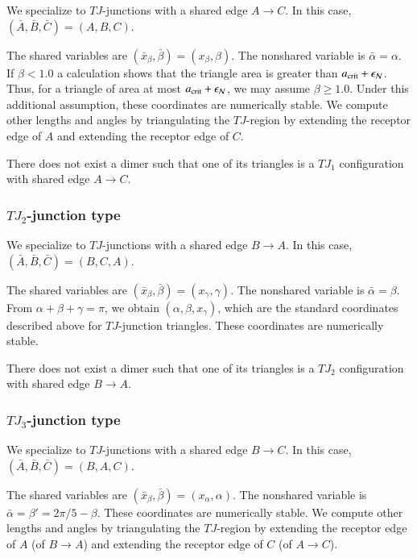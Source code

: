 We specialize to $TJ$-junctions with a shared edge $A\to C$.  In this
case, $(\bar A,\bar B,\bar C)=(A,B,C)$.

The shared variables are $(\bar x_\beta,\bar\beta)=(x_\beta,\beta)$.
The nonshared variable is $\bar\alpha=\alpha$.  If $\beta < 1.0$ a
calculation %
shows that the triangle area is greater than $a_\text{crit}+\epsilon_{\mathcal N}$.
Thus, for a triangle of area at most $a_\text{crit}+\epsilon_{\mathcal N}$, we may assume $\beta\ge1.0$.
Under this additional
assumption, these coordinates are numerically stable.
We compute other lengths and angles by triangulating the $TJ$-region
by extending the receptor edge of $A$ and extending the receptor edge
of $C$.

There does not exist a dimer such that one of its triangles
is a $TJ_1$ configuration with shared edge $A\to C$.

\subsubsection{$TJ_2$-junction type}

We specialize to $TJ$-junctions with a shared edge $B\to A$. In this
case, $(\bar A,\bar B,\bar C)=(B,C,A)$.

The shared variables are $(\bar x_\beta,\bar\beta)=(x_\gamma,\gamma)$.
The nonshared variable is $\bar\alpha =\beta$.  From
$\alpha+\beta+\gamma=\pi$, we obtain $(\alpha,\beta,x_\gamma)$, which
are the standard coordinates described above for $TJ$-junction
triangles.  These coordinates are numerically stable.

There does not exist a dimer such that one of its triangles
is a $TJ_2$ configuration with shared edge $B\to A$.

\subsubsection{$TJ_3$-junction type}

We specialize to $TJ$-junctions with a shared edge $B\to C$.
In this case, $(\bar A,\bar B,\bar C)=(B,A,C)$.

The shared variables are $(\bar x_\beta,\bar\beta)=(x_\alpha,\alpha)$.
The nonshared variable is $\bar\alpha=\beta'=2\pi/5-\beta$.  These
coordinates are numerically stable.  We compute other lengths and
angles by triangulating the $TJ$-region by extending the receptor edge
of $A$ (of $B\to A$) and extending the receptor edge of $C$ (of $A\to
C$).


